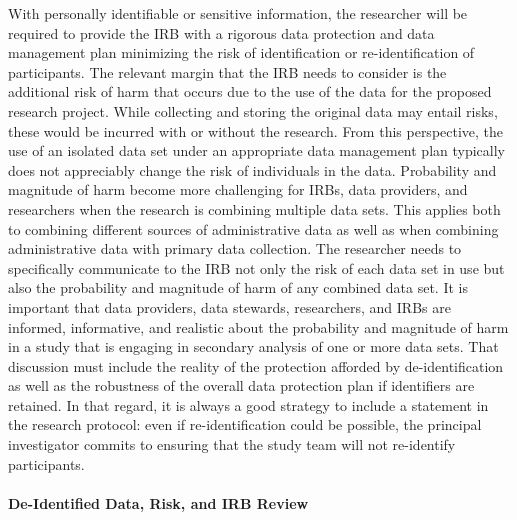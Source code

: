 With personally identifiable or sensitive information, the researcher will be required to provide the IRB with a rigorous data protection and data management plan minimizing the risk of identification or re-identification of participants. The relevant margin that the IRB needs to consider is the additional risk of harm that occurs due to the use of the data for the proposed research project. While collecting and storing the original data may entail risks, these would be incurred with or without the research. From this perspective, the use of an isolated data set under an appropriate data management plan typically does not appreciably change the risk of individuals in the data. Probability and magnitude of harm become more challenging for IRBs, data providers, and researchers when the research is combining multiple data sets. This applies both to combining different sources of administrative data as well as when combining administrative data with primary data collection. The researcher needs to specifically communicate to the IRB not only the risk of each data set in use but also the probability and magnitude of harm of any combined data set. It is important that data providers, data stewards, researchers, and IRBs are informed, informative, and realistic about the probability and magnitude of harm in a study that is engaging in secondary analysis of one or more data sets. That discussion must include the reality of the protection afforded by de-identification as well as the robustness of the overall data protection plan if identifiers are retained. In that regard, it is always a good strategy to include a statement in the research protocol: even if re-identification could be possible, the principal investigator commits to ensuring that the study team will not re-identify participants.

\hypertarget{de-identified-data-risk-and-irb-review}{%
\paragraph{De-Identified Data, Risk, and IRB Review}\label{de-identified-data-risk-and-irb-review}}

